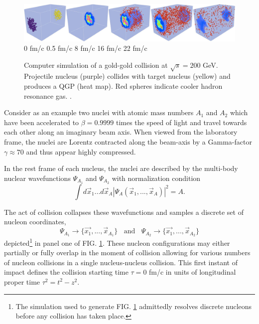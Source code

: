 \documentclass[aps,prc,reprint,amsmath,nofootinbib]{revtex4-1}
\begin{document}
\begin{figure}
  \centering
  \includegraphics[width=\textwidth]{evolution} \\
  0 fm/c   \hspace{.13\textwidth}
  0.5 fm/c \hspace{.13\textwidth}
  8 fm/c   \hspace{.13\textwidth}
  16 fm/c  \hspace{.13\textwidth}
  22 fm/c
  \caption{Computer simulation of a gold-gold collision at $\sqrt{s}=200$ GeV. Projectile nucleus (purple) collides with target nucleus (yellow) and produces a QGP (heat map). 
  Red spheres indicate cooler hadron resonance gas. \cite{iss}.}
  \label{fig:evolution}
\end{figure}

Consider as an example two nuclei with atomic mass numbers $A_1$ and $A_2$ which have been accelerated to $\beta=0.9999$ times the speed of light and travel towards
each other along an imaginary beam axis. When viewed from the laboratory frame, the nuclei are Lorentz contracted along the beam-axis by a Gamma-factor 
$\gamma \approx 70$ and thus appear highly compressed. 

In the rest frame of each nucleus, the nuclei are described by the multi-body nuclear wavefunctions $\Psi_{A_1}$ and $\Psi_{A_2}$ with normalization condition  
\begin{equation}
\int d\vec{x}_1 ... d\vec{x}_A \left | \Psi_A(\vec{x}_1,...,\vec{x}_A) \right|^2 = A.
\end{equation}

The act of collision collapses these wavefunctions and samples a discrete set of nucleon coordinates,
\begin{equation}
 \Psi_{A_1} \rightarrow \{\vec{x_1},...,\vec{x}_{A_1}\} ~~~~ \mbox{and} ~~~~ \Psi_{A_2} \rightarrow \{\vec{x_1},...,\vec{x}_{A_2}\}
\end{equation}
depicted\footnote{The simulation used to generate FIG. \ref{fig:evolution} admittedly resolves discrete nucleons before any collision has taken place.} in panel one 
of FIG. \ref{fig:evolution}. These nucleon configurations may either partially or fully overlap in the moment of collision allowing for various numbers of nucleon 
collisions in a single nucleus-nucleus collision. This first instant of impact defines the collision starting time $\tau=0$ fm/c in units of longitudinal proper time $\tau^2 = t^2-z^2$.
\end{document}
